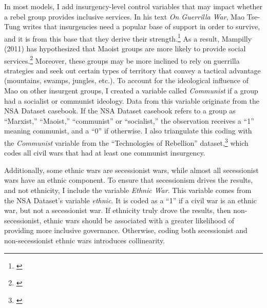 \documentclass[12pt, letterpaper]{article}
\begin{document}
\normalsize 

In most models, I add insurgency-level control variables that may impact whether a rebel group provides inclusive services. In his text \textit{On Guerrilla War}, Mao Tse-Tung writes that insurgencies need a popular base of support in order to survive, and it is from this base that they derive their strength.\footnote{\citealt[43-4]{tse2000guerrilla}} As a result, Mampilly (2011) has hypothesized that Maoist groups are more likely to provide social services.\footnote{\citealt[78-9]{mampilly2011rebel}} Moreover, these groups may be more inclined to rely on guerrilla strategies and seek out certain types of territory that convey a tactical advantage (mountains, swamps, jungles, etc.). To account for the ideological influence of Mao on other insurgent groups, I created a variable called \textit{Communist} if a group had a socialist or communist ideology. Data from this variable originate from the NSA Dataset casebook. If the NSA Dataset casebook refers to a group as ``Marxist,'' ``Maoist,'' ``communist'' or ``socialist,'' the observation receives a ``1'' meaning communist, and a ``0'' if otherwise.  I also triangulate this coding with the \textit{Communist} variable from the ``Technologies of Rebellion''  dataset,\footnote{\citealt{kalyvas2010international}} which codes all civil wars that had at least one communist insurgency.  

Additionally, some ethnic wars are secessionist wars, while almost all secessionist wars have an ethnic component. To ensure that secessionism drives the results, and not ethnicity, I include the variable \textit{Ethnic War}. This variable comes from the NSA Dataset's variable \textit{ethnic}. It is coded as a ``1''  if a civil war is an ethnic war, but not a secessionist war. If ethnicity truly drove the results, then non-secessionist, ethnic wars should be associated with a greater likelihood of providing more inclusive governance. Otherwise, coding both secessionist and non-secessionist ethnic wars introduces collinearity. 
\end{document}
